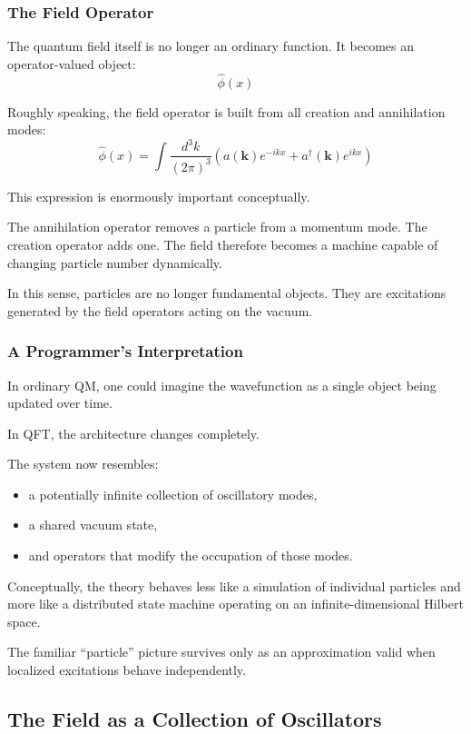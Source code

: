 \subsubsection*{The Field Operator}

The quantum field itself is no longer an ordinary function.
It becomes an operator-valued object:
\[
\hat{\phi}(x)
\]

Roughly speaking, the field operator is built from all creation and annihilation modes:
\[
\hat{\phi}(x)
=
\int \frac{d^3k}{(2\pi)^3}
\left(
a(\mathbf{k}) e^{-ikx}
+
a^\dagger(\mathbf{k}) e^{ikx}
\right)
\]

This expression is enormously important conceptually.

The annihilation operator removes a particle from a momentum mode.
The creation operator adds one.
The field therefore becomes a machine capable of changing particle number dynamically.

In this sense, particles are no longer fundamental objects.
They are excitations generated by the field operators acting on the vacuum.

\subsubsection*{A Programmer's Interpretation}

In ordinary QM, one could imagine the wavefunction as a single object being updated over time.

In QFT, the architecture changes completely.

The system now resembles:
\begin{itemize}
\item a potentially infinite collection of oscillatory modes,
\item a shared vacuum state,
\item and operators that modify the occupation of those modes.
\end{itemize}

Conceptually, the theory behaves less like a simulation of individual particles and more like a distributed state machine operating on an infinite-dimensional Hilbert space.

The familiar ``particle'' picture survives only as an approximation valid when localized excitations behave independently.


\subsection*{The Field as a Collection of Oscillators}


